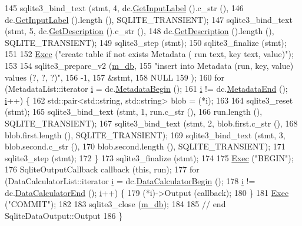 \begin{DoxyCode}
145   sqlite3\_bind\_text (stmt, 4, dc.\hyperlink{classns3_1_1DataCollector_a9a1807ddc67f99a76709e9a4107887d7}{GetInputLabel} ().c\_str (),
146                               dc.\hyperlink{classns3_1_1DataCollector_a9a1807ddc67f99a76709e9a4107887d7}{GetInputLabel} ().length (), SQLITE\_TRANSIENT);
147   sqlite3\_bind\_text (stmt, 5, dc.\hyperlink{classns3_1_1DataCollector_a64c22768dc317f616458608d9e1a6b4c}{GetDescription} ().c\_str (),
148                               dc.\hyperlink{classns3_1_1DataCollector_a64c22768dc317f616458608d9e1a6b4c}{GetDescription} ().length (), SQLITE\_TRANSIENT);
149   sqlite3\_step (stmt);
150   sqlite3\_finalize (stmt);
151 
152   \hyperlink{classns3_1_1SqliteDataOutput_a73206b50a726ca299f6347e35bb2dcc1}{Exec} (\textcolor{stringliteral}{"create table if not exists Metadata ( run text, key text, value)"});
153 
154   sqlite3\_prepare\_v2 (\hyperlink{classns3_1_1SqliteDataOutput_a6d9dcae5a1595e93e79a8ec365e3bbc9}{m\_db},
155     \textcolor{stringliteral}{"insert into Metadata (run, key, value) values (?, ?, ?)"},
156     -1,
157     &stmt,
158     NULL
159   );
160   \textcolor{keywordflow}{for} (MetadataList::iterator \hyperlink{bernuolliDistribution_8m_a6f6ccfcf58b31cb6412107d9d5281426}{i} = dc.\hyperlink{classns3_1_1DataCollector_a46dcf81704797c44d7194e7f14b43452}{MetadataBegin} ();
161        \hyperlink{bernuolliDistribution_8m_a6f6ccfcf58b31cb6412107d9d5281426}{i} != dc.\hyperlink{classns3_1_1DataCollector_a49eac13159763a8ef234677e76afc708}{MetadataEnd} (); \hyperlink{bernuolliDistribution_8m_a6f6ccfcf58b31cb6412107d9d5281426}{i}++) \{
162       std::pair<std::string, std::string> blob = (*i);
163 
164       sqlite3\_reset (stmt);
165       sqlite3\_bind\_text (stmt, 1, run.c\_str (),
166                                   run.length (), SQLITE\_TRANSIENT);
167       sqlite3\_bind\_text (stmt, 2, blob.first.c\_str (),
168                                   blob.first.length (), SQLITE\_TRANSIENT);
169       sqlite3\_bind\_text (stmt, 3, blob.second.c\_str (),
170                                   blob.second.length (), SQLITE\_TRANSIENT);
171       sqlite3\_step (stmt);
172     \}
173   sqlite3\_finalize (stmt);
174 
175   \hyperlink{classns3_1_1SqliteDataOutput_a73206b50a726ca299f6347e35bb2dcc1}{Exec} (\textcolor{stringliteral}{"BEGIN"});
176   SqliteOutputCallback callback (\textcolor{keyword}{this}, run);
177   \textcolor{keywordflow}{for} (DataCalculatorList::iterator \hyperlink{bernuolliDistribution_8m_a6f6ccfcf58b31cb6412107d9d5281426}{i} = dc.\hyperlink{classns3_1_1DataCollector_a22716600bb9685d1da74ddef53355e6f}{DataCalculatorBegin} ();
178        \hyperlink{bernuolliDistribution_8m_a6f6ccfcf58b31cb6412107d9d5281426}{i} != dc.\hyperlink{classns3_1_1DataCollector_a26e656c86a375228ae49645c387ad201}{DataCalculatorEnd} (); \hyperlink{bernuolliDistribution_8m_a6f6ccfcf58b31cb6412107d9d5281426}{i}++) \{
179       (*i)->Output (callback);
180     \}
181   \hyperlink{classns3_1_1SqliteDataOutput_a73206b50a726ca299f6347e35bb2dcc1}{Exec} (\textcolor{stringliteral}{"COMMIT"});
182 
183   sqlite3\_close (\hyperlink{classns3_1_1SqliteDataOutput_a6d9dcae5a1595e93e79a8ec365e3bbc9}{m\_db});
184 
185   \textcolor{comment}{// end SqliteDataOutput::Output}
186 \}
\end{DoxyCode}


